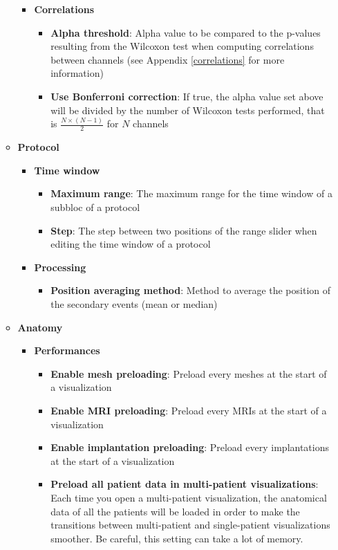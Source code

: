 \documentclass[a4paper]{article}
\begin{document}
\begin{itemize}
\begin{itemize}
\begin{itemize}
\begin{itemize}
\end{itemize}
\item \textbf{Correlations}
\begin{itemize}
\item \textbf{Alpha threshold}: Alpha value to be compared to the p-values resulting from the Wilcoxon test when computing correlations between channels (see Appendix \ref{correlations} for more information)
\item \textbf{Use Bonferroni correction}: If true, the alpha value set above will be divided by the number of Wilcoxon tests performed, that is $\frac{N \times (N - 1)}{2}$ for $N$ channels
\end{itemize}
\end{itemize}
\item \textbf{Protocol}
\begin{itemize}
\item \textbf{Time window}
\begin{itemize}
\item \textbf{Maximum range}: The maximum range for the time window of a subbloc of a protocol
\item \textbf{Step}: The step between two positions of the range slider when editing the time window of a protocol
\end{itemize}
\end{itemize}
\begin{itemize}
\item \textbf{Processing}
\begin{itemize}
\item \textbf{Position averaging method}: Method to average the position of the secondary events (mean or median)
\end{itemize}
\end{itemize}
\item \textbf{Anatomy}
\begin{itemize}
\item \textbf{Performances}
\begin{itemize}
\item \textbf{Enable mesh preloading}: Preload every meshes at the start of a visualization
\item \textbf{Enable MRI preloading}: Preload every MRIs at the start of a visualization
\item \textbf{Enable implantation preloading}: Preload every implantations at the start of a visualization
\item \textbf{Preload all patient data in multi-patient visualizations}: Each time you open a multi-patient visualization, the anatomical data of all the patients will be loaded in order to make the transitions between multi-patient and single-patient visualizations smoother. Be careful, this setting can take a lot of memory.

\end{itemize}
\end{itemize}
\end{itemize}
\end{itemize}
\end{document}
